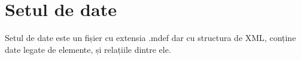 \newpage
\section{Setul de date}

Setul de date este un fișier cu extensia .mdef dar cu structura de XML, conține date legate de elemente, și relațiile dintre ele.